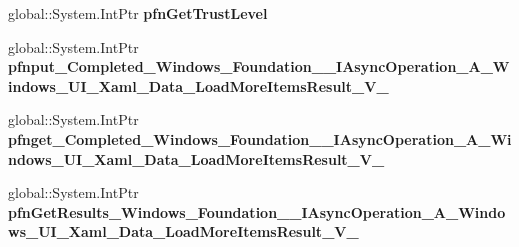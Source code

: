 \begin{DoxyCompactItemize}
\mbox{\label{struct_windows_1_1_foundation_1_1_i_async_operation___a___windows___u_i___xaml___data___load_mor4757a93b106839c8518b7060ad515b5e_afe79e5e6b9094198972f5e7713247601}} 
global\+::\+System.\+Int\+Ptr {\bfseries pfn\+Get\+Trust\+Level}
\item 
\mbox{\label{struct_windows_1_1_foundation_1_1_i_async_operation___a___windows___u_i___xaml___data___load_mor4757a93b106839c8518b7060ad515b5e_a980aeaf040a1062cc9ae3e9fcfa46042}} 
global\+::\+System.\+Int\+Ptr {\bfseries pfnput\+\_\+\+Completed\+\_\+\+Windows\+\_\+\+Foundation\+\_\+\+\_\+\+I\+Async\+Operation\+\_\+\+A\+\_\+\+Windows\+\_\+\+U\+I\+\_\+\+Xaml\+\_\+\+Data\+\_\+\+Load\+More\+Items\+Result\+\_\+\+V\+\_\+}
\item 
\mbox{\label{struct_windows_1_1_foundation_1_1_i_async_operation___a___windows___u_i___xaml___data___load_mor4757a93b106839c8518b7060ad515b5e_a3df29de1fcd0a12b85c6b1dfe6ea6f59}} 
global\+::\+System.\+Int\+Ptr {\bfseries pfnget\+\_\+\+Completed\+\_\+\+Windows\+\_\+\+Foundation\+\_\+\+\_\+\+I\+Async\+Operation\+\_\+\+A\+\_\+\+Windows\+\_\+\+U\+I\+\_\+\+Xaml\+\_\+\+Data\+\_\+\+Load\+More\+Items\+Result\+\_\+\+V\+\_\+}
\item 
\mbox{\label{struct_windows_1_1_foundation_1_1_i_async_operation___a___windows___u_i___xaml___data___load_mor4757a93b106839c8518b7060ad515b5e_a55fd99fc40213ae383afc5fcd043c7f1}} 
global\+::\+System.\+Int\+Ptr {\bfseries pfn\+Get\+Results\+\_\+\+Windows\+\_\+\+Foundation\+\_\+\+\_\+\+I\+Async\+Operation\+\_\+\+A\+\_\+\+Windows\+\_\+\+U\+I\+\_\+\+Xaml\+\_\+\+Data\+\_\+\+Load\+More\+Items\+Result\+\_\+\+V\+\_\+}
\end{DoxyCompactItemize}
